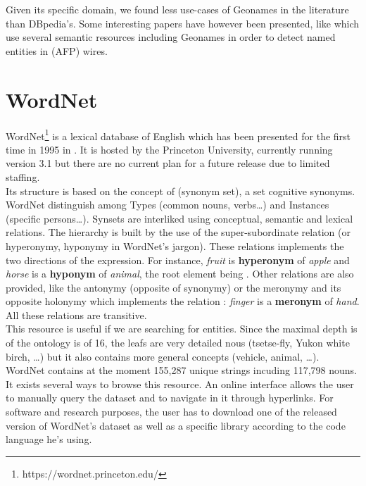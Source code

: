 Given its specific domain, we found less use-cases of Geonames in the literature than DBpedia's. Some interesting papers have however been presented, like \cite{stern2010detection} which use several semantic resources including Geonames in order to detect named entities in  (AFP) wires.

\section{WordNet} %
\label{sec:wordnet}

WordNet\footnote{https://wordnet.princeton.edu/} is a lexical database of English which has been presented for the first time in 1995 in \cite{miller1995wordnet}. It is hosted by the Princeton University, currently running version 3.1 but there are no current plan for a future release due to limited staffing.\\

Its structure is based on the concept of  (synonym set), a set cognitive synonyms. WordNet distinguish among Types (common nouns, verbs\dots) and Instances (specific persons\dots). Synsets are interliked using conceptual, semantic and lexical relations. The hierarchy is built by the use of the super-subordinate relation (or hyperonymy, hyponymy in WordNet's jargon). These relations implements the two directions of the  expression. For instance, \textit{fruit} is \textbf{hyperonym} of \textit{apple} and \textit{horse} is a \textbf{hyponym} of \textit{animal}, the root element being . Other relations are also provided, like the antonymy (opposite of synonymy) or the meronymy and its opposite holonymy which implements the  relation : \textit{finger} is a \textbf{meronym} of \textit{hand}. All these relations are transitive.\\

This resource is useful if we are searching for entities. Since the maximal depth is of the ontology is of 16, the leafs are very detailed nous (tsetse-fly, Yukon white birch, \dots) but it also contains more general concepts (vehicle, animal, \dots). WordNet contains at the moment 155,287 unique strings incuding 117,798 nouns.\\ 

It exists several ways to browse this resource. An online interface allows the user to manually query the dataset and to navigate in it through hyperlinks. For software and research purposes, the user has to download one of the released version of WordNet's dataset as well as a specific library according to the code language he's using.\\

